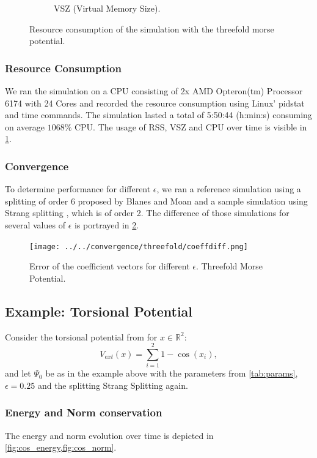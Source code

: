 \documentclass[11pt, a4paper, oneside]{article}
\begin{document}
\begin{figure}[h!]
\begin{subfigure}[b]{0.45 \textwidth}
    \caption{VSZ (Virtual Memory Size).}
  \end{subfigure}
  \caption{Resource consumption of the simulation with the threefold morse potential.}
  \label{fig:threefold_resource}
\end{figure}

\subsubsection{Resource Consumption}
We ran the simulation on a CPU consisting of 2x AMD Opteron(tm) Processor 6174 with 24 Cores and recorded the resource consumption using Linux' pidstat and time commands. The simulation lasted a total of 5:50:44 (h:min:s) consuming on average $1068 \%$ CPU. The usage of RSS, VSZ and CPU over time is visible in \cref{fig:threefold_resource}.


\subsubsection{Convergence} \label{sec:threefold_conv}
To determine performance for different $\epsilon$, we ran a reference simulation using a splitting of order 6 proposed by Blanes and Moan  and a sample simulation using Strang splitting , which is of order 2. The difference of those simulations for several values of $\epsilon$ is portrayed in \cref{fig:convthreefold}.
\begin{figure}[h]
  \centering
  \texttt{[image: ../../convergence/threefold/coeffdiff.png]}
  \caption{Error of the coefficient vectors for different $\epsilon$. Threefold Morse Potential.}
  \label{fig:convthreefold}
\end{figure}

\subsection{Example: Torsional Potential}
Consider the torsional potential from  for $x \in \mathbb{R}^2$:
\begin{equation*}
  V_{ext}(x) = \sum_{i=1}^2 1 - \cos(x_i),
\end{equation*}
and let $\Psi_0$ be as in the example above with the parameters from \cref{tab:params}, $\epsilon = 0.25$ and the splitting Strang Splitting again.

\subsubsection{Energy and Norm conservation}
The energy and norm evolution over time is depicted in \cref{fig:cos_energy,fig:cos_norm}.
\end{document}
